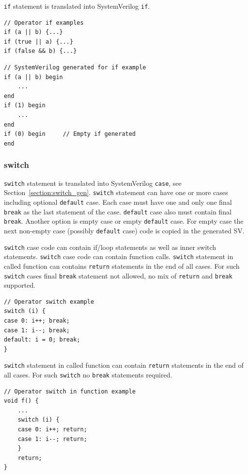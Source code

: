 {\tt if} statement is translated into SystemVerilog {\tt if}. 

\begin{lstlisting}[style=mycpp]
// Operator if examples
if (a || b) {...}
if (true || a) {...}
if (false && b) {...}
\end{lstlisting}
%
\begin{lstlisting}[style=myverilog]
// SystemVerilog generated for if example
if (a || b) begin 
    ... 
end
if (1) begin 
    ... 
end
if (0) begin     // Empty if generated
end
\end{lstlisting}

\subsubsection{switch}

{\tt switch} statement is translated into SystemVerilog {\tt case}, see Section~\ref{section:switch_gen}.
{\tt switch} statement can have one or more cases including optional {\tt default} case. Each case must have one and only one final {\tt break} as the last statement of the case. {\tt default} case also must contain final {\tt break}. Another option is empty case or empty {\tt default} case. For empty case the next non-empty case (possibly {\tt default} case) code is copied in the generated SV.

{\tt switch} case code can contain if/loop statements as well as inner switch statements. {\tt switch} case code can contain function calls. {\tt switch} statement in called function can contains {\tt return} statements in the end of all cases. For such {\tt switch} cases final {\tt break} statement not allowed, no mix of {\tt return} and {\tt break} supported.

\begin{lstlisting}[style=mycpp]
// Operator switch example
switch (i) {
case 0: i++; break;
case 1: i--; break;
default: i = 0; break;
}
\end{lstlisting}


{\tt switch} statement in called function can contain {\tt return} statements in the end of all cases. For such {\tt switch} no {\tt break} statements required.

\begin{lstlisting}[style=mycpp]
// Operator switch in function example
void f() {
    ...
    switch (i) {
    case 0: i++; return;
    case 1: i--; return;
    }
    return;
}
\end{lstlisting}


